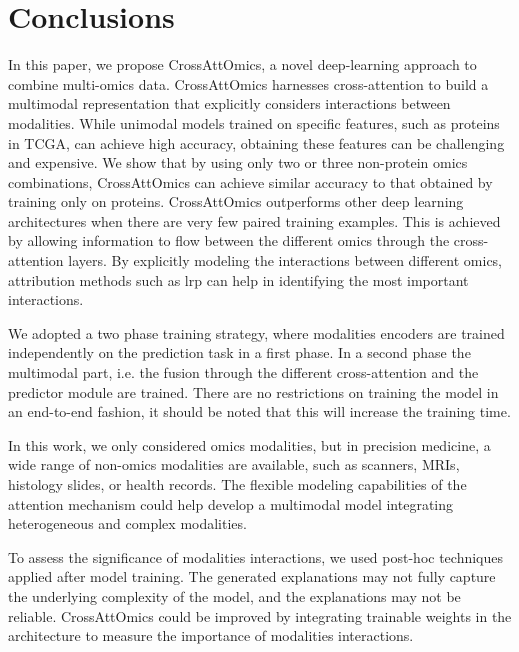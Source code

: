 \documentclass[../main.tex]{subfiles}
\begin{document}
\section{Conclusions}
	In this paper, we propose CrossAttOmics, a novel deep-learning approach to combine multi-omics data.
	CrossAttOmics harnesses cross-attention to build a multimodal representation that explicitly considers interactions between modalities.
	While unimodal models trained on specific features, such as proteins in TCGA, can achieve high accuracy, obtaining these features can be challenging and expensive.
	We show that by using only two or three non-protein omics combinations, CrossAttOmics can achieve similar accuracy to that obtained by training only on proteins.
	CrossAttOmics outperforms other deep learning architectures when there are very few paired training examples.
	This is achieved by allowing information to flow between the different omics through the cross-attention layers.
	By explicitly modeling the interactions between different omics, attribution methods such as \gls{lrp} can help in identifying the most important interactions.

	We adopted a two phase training strategy, where modalities encoders are trained independently on the prediction task in a first phase.
	In a second phase the multimodal part, i.e. the fusion through the different cross-attention and the predictor module are trained.
	There are no restrictions on training the model in an end-to-end fashion, it should be noted that this will increase the training time.

	In this work, we only considered omics modalities, but in precision medicine, a wide range of non-omics modalities are available, such as scanners, MRIs, histology slides, or health records.
	The flexible modeling capabilities of the attention mechanism could help develop a multimodal model integrating heterogeneous and complex modalities.

	To assess the significance of modalities interactions, we used post-hoc techniques applied after model training.
	The generated explanations may not fully capture the underlying complexity of the model, and the explanations may not be reliable.
	CrossAttOmics could be improved by integrating trainable weights in the architecture to measure the importance of modalities interactions.
\end{document}
